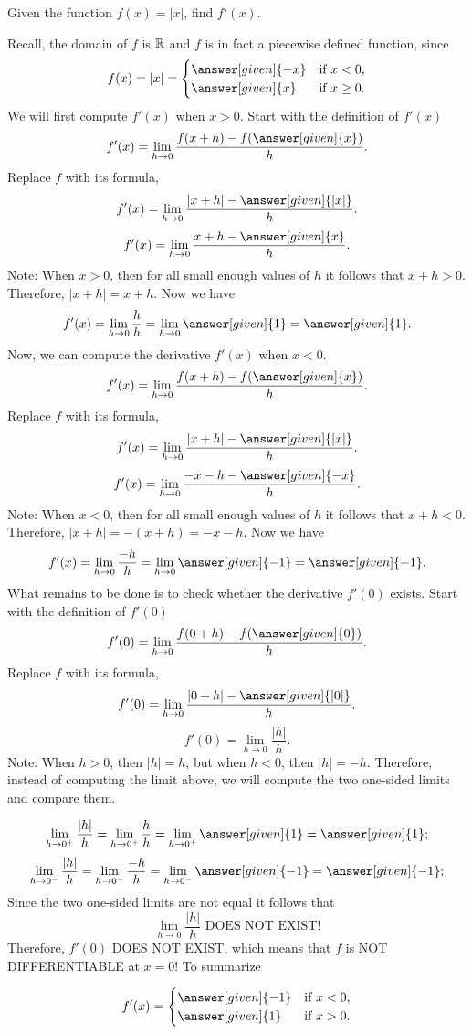 \documentclass{ximera}
\begin{document}
\begin{example}
	Given the function $f(x) = |x|$, find  $f'(x)$. \\
	
	\begin{explanation}
	Recall, the  domain of $f$ is  $\mathbb R$ and 
  $f$ is in fact a piecewise defined function, since
  \[
f(x) = |x|=
\begin{cases}
  \answer[given]{-x} &\text{if $x<0$,}\\
  \answer[given]{x} &\text{if $x\ge 0$}.
\end{cases}
\]
We will first compute $f'(x)$ when $x>0$.
		Start with the definition of $f'(x)$
		\[
		f'(x) = \lim_{h\to0}\frac{f(x+h)-f(\answer[given]{x})}{h}.
		\]
		Replace $f$ with its formula,
		\[
		f'(x) = \lim_{h\to0}\frac{|x+h|-\answer[given]{|x|}}{h}.
		\]
		\[
		f'(x) = \lim_{h\to0}\frac{x+h-\answer[given]{x}}{h}.
		\]
		Note: When $x>0$, then for all small enough values of  $h$ it follows that $x+h>0$. 
		Therefore, $|x+h|=x+h$.
		Now we have
		\[
		f'(x) = \lim_{h\to0}\frac{h}{h}= \lim_{h\to0}\answer[given]{1}=\answer[given]{1}.
		\]
	Now, we can compute the derivative 	$f'(x)$ when $x<0$.
\[
		f'(x) = \lim_{h\to0}\frac{f(x+h)-f(\answer[given]{x})}{h}.
		\]
		Replace $f$ with its formula,
		\[
		f'(x) = \lim_{h\to0}\frac{|x+h|-\answer[given]{|x|}}{h}.
		\]
		\[
		f'(x) = \lim_{h\to0}\frac{-x-h-\answer[given]{-x}}{h}.
		\]
		Note: When $x<0$, then for all small enough values of  $h$ it follows that $x+h<0$. 
		Therefore, $|x+h|=-(x+h)=-x-h$.
		Now we have
		\[
		f'(x) = \lim_{h\to0}\frac{-h}{h}= \lim_{h\to0}\answer[given]{-1}=\answer[given]{-1}.
		\]
		What remains to be done is to check whether the derivative $f'(0)$ exists.
		Start with the definition of $f'(0)$
		\[
		f'(0) = \lim_{h\to0}\frac{f(0+h)-f(\answer[given]{0})}{h}.
		\]
		Replace $f$ with its formula,
		\[
		f'(0) = \lim_{h\to0}\frac{|0+h|-\answer[given]{|0|}}{h}.
		\]
		\[
		f'(0) = \lim_{h\to0}\frac{|h|}{h}.
		\]
		Note: When $h>0$, then $|h|=h$, but when $h<0$, then $|h|=-h$. 
		Therefore, instead of computing the limit above, we will compute the two one-sided limits and compare them.
		
		\[
		 \lim_{h\to0^+}\frac{|h|}{h}= \lim_{h\to0^+}\frac{h}{h}=\lim_{h\to0^+}\answer[given]{1}=\answer[given]{1};
		\]
		\[
		 \lim_{h\to0^-}\frac{|h|}{h}= \lim_{h\to0^-}\frac{-h}{h}=\lim_{h\to0^-}\answer[given]{-1}=\answer[given]{-1};
		\]
		Since the two one-sided limits are not equal it follows that 
		\[
		 \lim_{h\to0}\frac{|h|}{h} {\text{           DOES NOT EXIST!}}
		\]
		Therefore,   $f'(0)$ DOES NOT EXIST, which means that $f$ is NOT DIFFERENTIABLE at $x=0$!
		To summarize
		
		 \[
f'(x) =
\begin{cases}
  \answer[given]{-1} &\text{if $x<0$,}\\
  \answer[given]{1} &\text{if $x> 0$}.
\end{cases}
\]
	\end{explanation}
\end{example}
\end{document}
